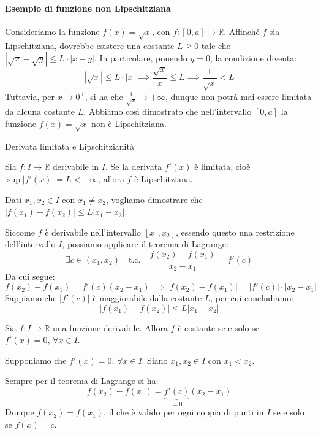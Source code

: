 \documentclass[12pt]{report}
\newcommand{\R}{\mathbb{R}}
\begin{document}
	\paragraph{Esempio di funzione non Lipschitziana}
	Consideriamo la funzione $f(x) = \sqrt{x}$, con $f: [0, a] \to \R$.
	Affinché $f$ sia Lipschitziana, dovrebbe esistere una costante $L \ge 0$ tale che $|\sqrt{x} - \sqrt{y}| \le L \cdot |x - y|$. In particolare, ponendo $y = 0$, la condizione diventa:
	\[
	|\sqrt{x}| \le L \cdot |x| \implies \frac{\sqrt{x}}{x} \le L \implies \frac{1}{\sqrt{x}} < L
	\]
	Tuttavia, per $x \to 0^+$, si ha che $\frac{1}{\sqrt{x}} \to +\infty$, dunque non potrà mai essere limitata da alcuna costante $L$. Abbiamo così dimostrato che nell'intervallo $[0, a]$ la funzione $f(x) = \sqrt{x}$ non è Lipschitziana.
	
	\begin{teorema}{Derivata limitata e Lipschitzianità}{}
		
		Sia $f: I \to \R$ derivabile in $I$. Se la derivata $f'(x)$ è limitata, cioè $\sup |f'(x)| = L < +\infty$, allora $f$ è Lipschitziana.
		
	\end{teorema}
	
	\begin{dimostrazione}{}{}
		
		Dati $x_1, x_2 \in I$ con $x_1 \neq x_2$, vogliamo dimostrare che $|f(x_1) - f(x_2)| \le L |x_1 - x_2|$.
		
		\smallbreak
		Siccome $f$ è derivabile nell'intervallo $[x_1, x_2]$, essendo questo una restrizione dell'intervallo $I$, possiamo applicare il teorema di Lagrange:
		\[
		\exists c \in (x_1, x_2) \quad \text{t.c.} \quad \frac{f(x_2) - f(x_1)}{x_2 - x_1} = f'(c)
		\]
		Da cui segue:
		\[
		f(x_2) - f(x_1) = f'(c)(x_2 - x_1) \implies |f(x_2) - f(x_1)| = |f'(c)| \cdot |x_2 - x_1|
		\]
		Sappiamo che $|f'(c)|$ è maggiorabile dalla costante $L$, per cui concludiamo:
		\[
		|f(x_1) - f(x_2)| \le L |x_1 - x_2|
		\]
		
	\end{dimostrazione}
	
	\begin{proposizione}{}{}
		
		Sia $f: I \to \R$ una funzione derivabile. Allora $f$ è costante se e solo se $f'(x) = 0, \, \forall x \in I$.
		
	\end{proposizione}
	
	\begin{dimostrazione}{}{}
		
		Supponiamo che $f'(x) = 0, \, \forall x \in I$. Siano $x_1, x_2 \in I$ con $x_1 < x_2$.
		
		\smallbreak
		Sempre per il teorema di Lagrange si ha:
		\[
		f(x_2) - f(x_1) = \underbrace{f'(c)}_{=0} (x_2 - x_1)
		\]
		Dunque $f(x_2) = f(x_1)$, il che è valido per ogni coppia di punti in $I$ se e solo se $f(x) = c$.
		
	\end{dimostrazione}
	
\end{document}
